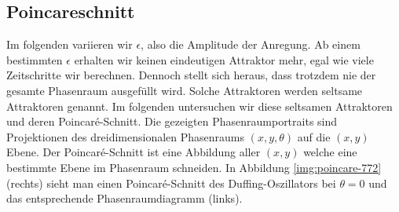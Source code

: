 \documentclass[12pt,a4paper]{article}
\begin{document}
\subsection{ Poincareschnitt }
Im folgenden variieren wir $\epsilon$, also die Amplitude der Anregung.
Ab einem bestimmten $\epsilon$ erhalten wir keinen eindeutigen Attraktor mehr, egal wie viele Zeitschritte wir berechnen. Dennoch stellt sich heraus, dass trotzdem nie der gesamte Phasenraum ausgefüllt wird. Solche Attraktoren werden seltsame Attraktoren genannt. Im folgenden untersuchen wir diese seltsamen Attraktoren und deren Poincaré-Schnitt. 
Die gezeigten Phasenraumportraits sind Projektionen des dreidimensionalen Phasenraums $(x,y,\theta)$ auf die $(x,y)$ Ebene. Der Poincaré-Schnitt ist eine Abbildung aller $(x,y)$ welche eine bestimmte Ebene im Phasenraum schneiden. In Abbildung \ref{img:poincare-772} (rechts) sieht man einen Poincaré-Schnitt des Duffing-Oszillators bei $\theta=0$ und das entsprechende Phasenraumdiagramm (links).
\end{document}
